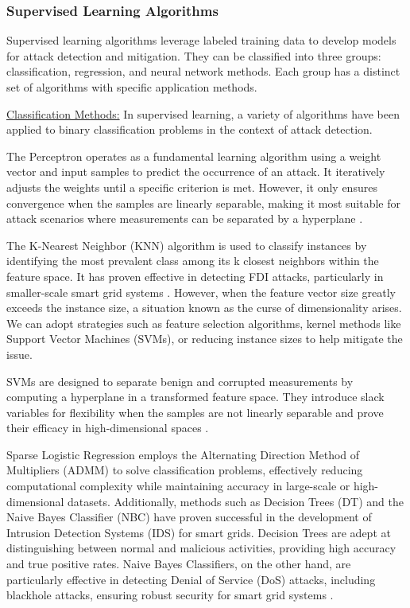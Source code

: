 \documentclass[10pt, journal]{IEEEtran}
\begin{document}
\subsubsection{Supervised Learning Algorithms}
Supervised learning algorithms leverage labeled training data to develop models for attack detection and mitigation. They can be classified into three groups: classification, regression, and neural network methods. Each group has a distinct set of algorithms with specific application methods.
        
\underline{Classification Methods:} In supervised learning, a variety of algorithms have been applied to binary classification problems in the context of attack detection. 

The Perceptron operates as a fundamental learning algorithm using a weight vector and input samples to predict the occurrence of an attack. It iteratively adjusts the weights until a specific criterion is met. However, it only ensures convergence when the samples are linearly separable, making it most suitable for attack scenarios where measurements can be separated by a hyperplane \cite{ozay2015machine}. 

The K-Nearest Neighbor (KNN) algorithm is used to classify instances by identifying the most prevalent class among its k closest neighbors within the feature space. It has proven effective in detecting FDI attacks, particularly in smaller-scale smart grid systems \cite{azad2019transformation}\cite{yan2016detection}. However, when the feature vector size greatly exceeds the instance size, a situation known as the curse of dimensionality arises. We can adopt strategies such as feature selection algorithms, kernel methods like Support Vector Machines (SVMs), or reducing instance sizes to help mitigate the issue.

SVMs are designed to separate benign and corrupted measurements by computing a hyperplane in a transformed feature space. They introduce slack variables for flexibility when the samples are not linearly separable and prove their efficacy in high-dimensional spaces \cite{esmalifalak2014detecting,sakhnini2019smart,ahmed2018feature,zhang2011distributed}. 

Sparse Logistic Regression employs the Alternating Direction Method of Multipliers (ADMM) to solve classification problems, effectively reducing computational complexity while maintaining accuracy in large-scale or high-dimensional datasets. Additionally, methods such as Decision Trees (DT) and the Naive Bayes Classifier (NBC) have proven successful in the development of Intrusion Detection Systems (IDS) for smart grids. Decision Trees are adept at distinguishing between normal and malicious activities, providing high accuracy and true positive rates. Naive Bayes Classifiers, on the other hand, are particularly effective in detecting Denial of Service (DoS) attacks, including blackhole attacks, ensuring robust security for smart grid systems \cite{radoglou2018anomaly,boumkheld2016intrusion}.
\end{document}
